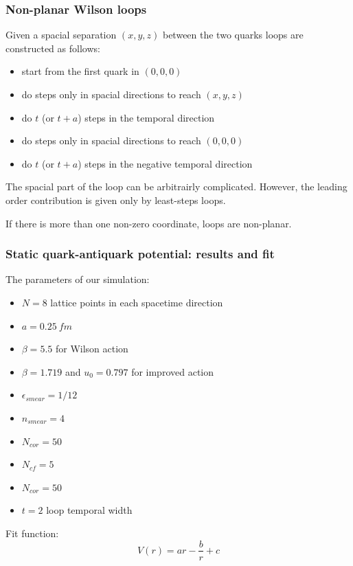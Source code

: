 \documentclass{beamer}
\begin{document}
\begin{frame}
    \frametitle{Non-planar Wilson loops}
    Given a spacial separation $(x,y,z)$ between the two quarks loops are constructed as follows:
    \begin{itemize}
        \item start from the first quark in $(0,0,0)$
        \item do steps only in spacial directions to reach $(x,y,z)$
        \item do $t$ (or $t+a$) steps in the temporal direction
        \item do steps only in spacial directions to reach $(0,0,0)$
        \item do $t$ (or $t+a$) steps in the negative temporal direction
    \end{itemize}
    The spacial part of the loop can be arbitrairly complicated.
    However, the leading order contribution is given only by least-steps loops.

    If there is more than one non-zero coordinate, loops are non-planar.
\end{frame}

\begin{frame}
    \frametitle{Static quark-antiquark potential: results and fit}
    The parameters of our simulation:
    \begin{itemize}
        \item $N=8$ lattice points in each spacetime direction
        \item $a=0.25\ fm$
        \item $\beta = 5.5$ for Wilson action
        \item $\beta = 1.719$ and $u_0 = 0.797$ for improved action
        \item $\epsilon_{smear} = 1/12$
        \item $n_{smear} = 4$
        \item $N_{cor} = 50$
        \item $N_{cf} = 5$
        \item $N_{cor} = 50$
        \item $t = 2$ loop temporal width
    \end{itemize}
    Fit function:
    $$V(r) = ar - \frac{b}{r} + c$$
\end{frame}
\end{document}
